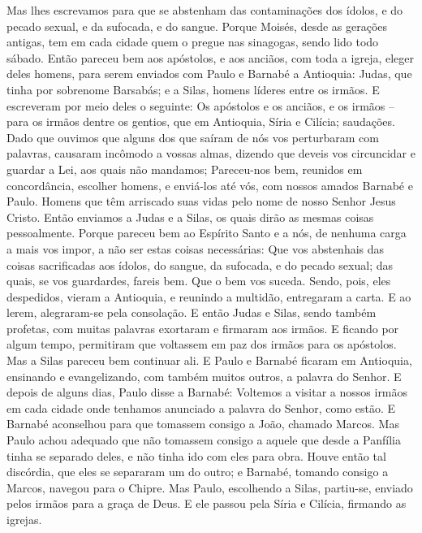{  Mas
{} lhes escrevamos para que se abstenham das contaminações dos ídolos, e do pecado sexual, e da
{} sufocada, e do sangue.
  Porque Moisés, desde as gerações antigas, tem em cada cidade quem o pregue nas sinagogas, sendo lido todo sábado.
  Então pareceu bem aos apóstolos, e aos anciãos, com toda a igreja, eleger deles
{} homens, para serem enviados com Paulo e Barnabé a Antioquia: Judas, que tinha por sobrenome Barsabás; e a Silas, homens líderes entre os irmãos.
  E escreveram por meio deles o seguinte: Os apóstolos e os anciãos, e os irmãos – para os irmãos dentre os gentios, que
{} em Antioquia, Síria e Cilícia; saudações.
  Dado que ouvimos que alguns dos que saíram de nós vos perturbaram com palavras,
{} causaram incômodo a vossas almas, dizendo que deveis vos circuncidar e guardar a Lei, aos quais não mandamos;
  Pareceu-nos bem, reunidos em concordância, escolher
{} homens, e enviá-los até vós, com nossos amados Barnabé e Paulo.
  Homens que têm arriscado suas vidas pelo nome de nosso Senhor Jesus Cristo.
  Então enviamos a Judas e a Silas, os quais
{} dirão as mesmas coisas pessoalmente.
  Porque pareceu bem ao Espírito Santo e a nós, de nenhuma carga a mais vos impor, a não ser estas coisas necessárias:
  Que vos abstenhais das coisas sacrificadas aos ídolos, do sangue, da
{} sufocada, e do pecado sexual; das quais, se vos guardardes, fareis bem. Que o bem vos suceda.
  Sendo, pois, eles despedidos, vieram a Antioquia, e reunindo a multidão, entregaram a carta.
  E ao lerem, alegraram-se pela consolação.
  E então Judas e Silas, sendo também profetas, com muitas palavras exortaram e firmaram aos irmãos.
  E ficando
{} por algum tempo, permitiram que voltassem em paz dos irmãos para os apóstolos.
  Mas a Silas pareceu bem continuar ali.
  E Paulo e Barnabé ficaram em Antioquia, ensinando e evangelizando, com também muitos outros, a palavra do Senhor.
  E depois de alguns dias, Paulo disse a Barnabé: Voltemos a visitar a nossos irmãos em cada cidade onde tenhamos anunciado a palavra do Senhor,
{} como estão.
  E Barnabé aconselhou para que tomassem consigo a João, chamado Marcos.
  Mas Paulo achou adequado que não tomassem consigo a aquele que desde a Panfília tinha se separado deles, e não tinha ido com eles para
{} obra.
  Houve então
{} tal discórdia, que eles se separaram um do outro; e Barnabé, tomando consigo a Marcos, navegou para o Chipre.
  Mas Paulo, escolhendo a Silas, partiu-se, enviado pelos irmãos para a graça de Deus.
  E ele passou pela Síria e Cilícia, firmando as igrejas.
\par }

